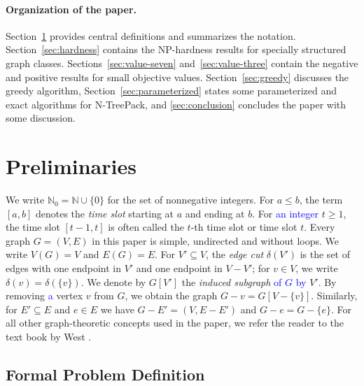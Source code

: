 \documentclass[runningheads]{llncs}
\newcommand{\NN}{\mathbb{N}}
\newcommand{\set}[1]{\{ #1 \}}
\newcommand{\xxxNTP}{{\sc N-TreePack}}
\newcommand{\lasse}[1]{\textcolor{blue}{#1}}
\begin{document}
\paragraph{Organization of the paper.}
Section~\ref{sec:notation} provides central definitions and summarizes the notation.
Section~\ref{sec:hardness} contains the NP-hardness results for specially structured graph classes. 
Sections~\ref{sec:value-seven} and~\ref{sec:value-three} contain the negative and positive results 
for small objective values. 
Section~\ref{sec:greedy} discusses the greedy algorithm, 
Section~\ref{sec:parameterized} states some parameterized and exact algorithms for {\xxxNTP}, and
\cref{sec:conclusion} concludes the paper with some discussion.


\section{Preliminaries}
\label{sec:notation}

We write $\NN_0= \NN \cup \set{0}$ for the set of nonnegative integers. 
For $a\le b$, the term $[a,b]$ denotes the \emph{time slot} starting at $a$ and ending at $b$. 
For \lasse{an integer} $t\ge1$, the time slot $[t-1,t]$ is often called the $t$-th time slot or time slot $t$.
Every graph $G=(V,E)$ in this paper is simple, undirected and without loops. We write $V(G) = V$ and $E(G) = E$.
For $V'\subseteq V$, the \emph{edge cut} $\delta(V')$ is the set of edges with one endpoint 
in $V'$ and one endpoint in $V-V'$; for $v\in V$, we write $\delta(v) = \delta(\set{v})$.
We denote by $G[V']$ the \emph{induced subgraph} \lasse{of $G$ by} $V'$.
By removing \lasse{a} vertex $v$ from $G$, we obtain the graph $G-v=G[V-\set{v}]$.
Similarly, for $E'\subseteq E$ and $e\in E$ we have $G-E'=(V,E-E')$ and $G-e=G-\set{e}$. For all other graph-theoretic concepts used in the paper, we refer the reader to the
text book by West \cite{WestBook}.

\subsection{Formal Problem Definition}
\end{document}
